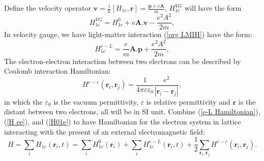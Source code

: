\documentclass[12pt,english,a4paper]{article}
\begin{document}
	\quad Define the velocity operator $\textbf{v}= \frac{i}{\hbar} [H_{1e}, \textbf{r}] = \frac{\textbf{p}+e\textbf{A}}{m}$, $H^{VG}_{1e}$ will have the form
	\begin{equation}
		\label{H VG}
		H^{VG}_{1e} = H^0_{1e} + e \textbf{A}.\textbf{v} - \frac{e^2A^2}{2m},
	\end{equation}
	In velocity gauge, we have light-matter interaction (\ref{org LMIH})  have the form:
	\begin{equation}
		\label{e-L Hamiltonian}
		H^{e-L}_{1e} =\frac{e}{m} \textbf{A}.\textbf{p} + \frac{e^2 A^2}{2m},
	\end{equation}
	The electron-electron interaction between two electrons can be described by Coulomb interaction Hamiltonian:
	\begin{equation}
		\label{H ee}
		H^{e-e}(\textbf{r}_i, \textbf{r}_j) = \frac{1}{4\pi \varepsilon \varepsilon_0}\frac{e^2}{|\textbf{r}_i-\textbf{r}_j|},
	\end{equation}
	in which the $\varepsilon_0$ is the vacuum permittivity, $\varepsilon$ is relative permittivity and $\textbf{r}$ is the distant between two electrons, all will be in SI unit.
	Combine (\ref{e-L Hamiltonian}), (\ref{H ee}),  and (\ref{H01e}) to have Hamiltonian for the electron system in lattice interacting with the present of an external electromagnetic field:
	\begin{equation}
		\label{1st Quanti}
		H = \sum_{i} H_{1e}(\textbf{r}_i ,t) = \sum_{i} H^0_{1e} (\textbf{r}_i) + \sum_{i} H^{e-L}_{1e} (\textbf{r}_i,t) + \frac{1}{2} \sum_{\textbf{r}_i, \textbf{r}_j}H^{e-e}(\textbf{r}_i, \textbf{r}_j).
	\end{equation}
\end{document}

